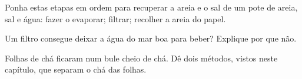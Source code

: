 \begin{exercise}[$\star$]\label{exo:g3:separating-mixtures:9}
Ponha estas etapas em ordem para recuperar a areia e o sal de um pote de
areia, sal e água: fazer o  evaporar; filtrar; recolher a areia
do papel.
\end{exercise}

\begin{exercise}[$\star\star$]\label{exo:g3:separating-mixtures:10}
Um filtro consegue deixar a água do mar boa para beber? Explique por
que não.
\end{exercise}

\begin{exercise}[$\star\star$]\label{exo:g3:separating-mixtures:11}
Folhas de chá ficaram num bule cheio de chá. Dê dois métodos, vistos
neste capítulo, que separam o chá das folhas.
\end{exercise}
